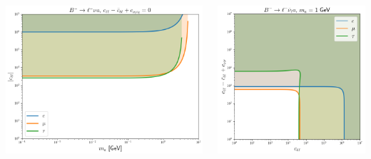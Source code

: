 \documentclass[mathserif, 10pt, aspectratio=169]{beamer}
\begin{document}
\begin{frame}
    \begin{columns}
        \begin{column}{0.55\textwidth}
            \includegraphics[width=\columnwidth]{figures/limcl.png}
        \end{column}
        \begin{column}{0.4\textwidth}
            \includegraphics[width=\columnwidth]{figures/lim_c_1GeV.png}
        \end{column}
    \end{columns}
\end{frame}
\end{document}
